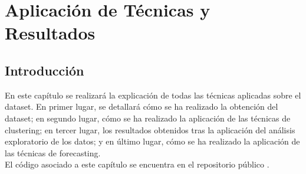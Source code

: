 
\chapter{Aplicación de Técnicas y Resultados} %
\label{chap:results} %


\section{Introducción}

En este capítulo se realizará la explicación de todas las técnicas aplicadas sobre el dataset. En primer lugar, se detallará cómo se ha realizado la obtención del dataset; en segundo lugar, cómo se ha realizado la aplicación de las técnicas de clustering; en tercer lugar, los resultados obtenidos tras la aplicación del análisis exploratorio de los datos; y en último lugar, cómo se ha realizado la aplicación de las técnicas de forecasting. \\

El código asociado a este capítulo se encuentra en el repositorio público \citep{master}.







